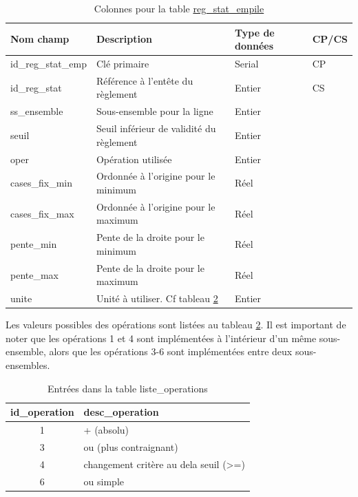         \begin{table}[h]
           \centering
           \begin{tabular}{m{}|m{}m{}m{}}
                \hline
                Nom champ & Description & Type de données & CP/CS  \\
                \hline
                id\_reg\_stat\_emp & Clé primaire  & Serial & CP \\ 
                id\_reg\_stat & Référence à l'entête du règlement & Entier & CS \\ 
                ss\_ensemble & Sous-ensemble pour la ligne & Entier & \\ 
                seuil & Seuil inférieur de validité du règlement & Entier & \\ 
                oper  & Opération utilisée  & Entier & \\
                cases\_fix\_min & Ordonnée à l'origine pour le minimum & Réel & \\
                cases\_fix\_max & Ordonnée à l'origine pour le maximum  & Réel & \\ 
                pente\_min & Pente de la droite pour le minimum & Réel & \\
                pente\_max & Pente de la droite pour le maximum & Réel & \\
                unite & Unité à utiliser. Cf tableau \ref{tab:operations_table} & Entier & \\
                \hline
           \end{tabular}
           \caption{Colonnes pour la table \underline{reg\_stat\_empile}}
           \label{tab:definition_reg_stat_emp}
        \end{table}    
        \clearpage
        Les valeurs possibles des opérations sont listées au tableau \ref{tab:operations_table}. Il est important de noter que les opérations 1 et 4 sont implémentées à l'intérieur d'un même sous-ensemble, alors que les opérations 3-6 sont implémentées entre deux sous-ensembles.\par
        \begin{table}[h]
            \centering
            \begin{tabular}{cl}
                 \hline
                 id\_operation & desc\_operation  \\ \hline
                 1 & + (absolu)\\
                 3 & ou (plus contraignant) \\
                 4 & changement critère au dela seuil (>=)\\
                 6 & ou simple \\ \hline
            \end{tabular}
            \caption{Entrées dans la table liste\_operations}
            \label{tab:operations_table}
        \end{table}
